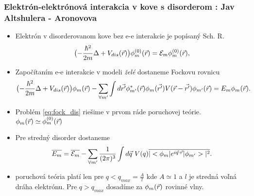 \documentclass[
	11pt, %
]{beamer}
\begin{document}
\begin{frame}
\frametitle{Elektrón-elektrónová interakcia v kove s disorderom : Jav Altshulera - Aronovova}
\begin{itemize}
\item Elektrón v disorderovanom kove bez e-e interakcie je popísaný Sch. R.
\begin{equation}
\label{eq:schr_dis}
\bigl(-\frac{\hbar^2}{2m}\Delta + V_{dis}(\vec{r})\bigr)\phi_m^{(0)}(\vec{r})=\mathcal{E}_m\phi_m^{(0)}(\vec{r}) \text{,}
\end{equation}
\item Započítaním e-e interakcie v modeli \emph{želé} dostaneme Fockovu rovnicu
\small
\begin{equation}
 \label{eq:fock_dis}
 \bigl(-\frac{\hbar^2}{2m}\Delta + V_{dis}(\vec{r}) \bigr)\phi_m(\vec{r})-\sum_{\forall m'} \int d\vec{r'} \phi^*_{m'}(\vec{r})\phi_{m}(\vec{r'})V(\vec{r}-\vec{r'})\phi_{m'}(\vec{r})=E_m\phi_m(\vec{r}) \text{.}
\end{equation}
\normalsize
\item Problém \eqref{eq:fock_dis} riešime v prvom ráde poruchovej teórie. $\phi_m(\vec{r}) \simeq \phi_m^{(0)}(\vec{r})$
\item Pre stredný disorder dostaneme 
\small
\begin{equation}
\label{eq:erg_meandis}
 \overline{E_m}=\overline{\mathcal{E}_m}-\sum_{\forall m'} \frac{1}{(2\pi)^{3}} \int d\vec{q}\ V(q) \overline{|<\phi_m|e^{i\vec{q}\cdot\vec{r}}|\phi_{m'}>|^2} \text{.}
\end{equation}
\normalsize
\item poruchová teória platí len pre $q<q_{max}=\frac{A}{l}$ kde $A\simeq 1$ a $l$ je stredná voľná dráha elektrónu. Pre $q>q_{max}$ dosadíme za $\phi_m(\vec{r})$ rovinné vlny.
\end{itemize}
\end{frame}
\end{document}
